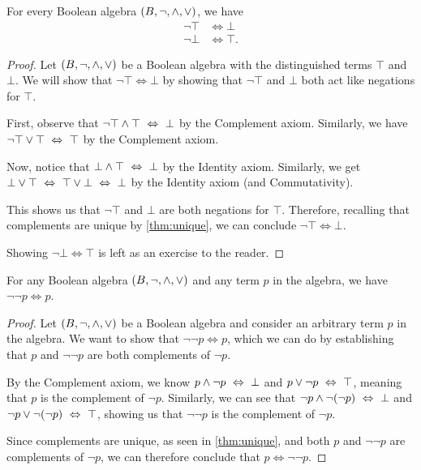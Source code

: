 \begin{lemma}
    For every Boolean algebra \((B, \neg, \wedge, \vee)\), we have
    \begin{align*}
        \neg \top &\iff \bot\\
        \neg \bot &\iff \top.
    \end{align*}
\end{lemma}
\begin{proof}
    Let \((B, \neg, \wedge, \vee)\) be a Boolean algebra with the distinguished terms \(\top\) and \(\bot\).
    We will show that \(\neg \top \iff \bot\) by showing that
    \(\neg \top\) and \(\bot\) both act like negations for \(\top\).

    First, observe that \(\neg \top \wedge \top ~\Leftrightarrow~ \bot\) by the Complement axiom.
    Similarly, we have \(\neg \top \vee \top ~\Leftrightarrow~ \top\) by the Complement axiom.

    Now, notice that \(\bot \wedge \top ~\Leftrightarrow~ \bot\) by the Identity axiom.
    Similarly, we get \(\bot \vee \top ~\Leftrightarrow~ \top \vee \bot ~\Leftrightarrow~ \bot\) by the Identity axiom
    (and Commutativity).

    This shows us that \(\neg \top\) and \(\bot\) are both negations for \(\top\).
    Therefore, recalling that complements are unique by \autoref{thm:unique},
    we can conclude \(\neg \top \iff \bot\).

    Showing \(\neg \bot \iff \top\) is left as an exercise to the reader.
\end{proof}

\newpage

\begin{theorem}
    For any Boolean algebra \((B, \neg, \wedge, \vee)\) and any term \(p\) in the algebra,
    we have \(\neg \neg p \iff p\).
\end{theorem}
\begin{proof}
    Let \((B, \neg, \wedge, \vee)\) be a Boolean algebra
    and consider an arbitrary term \(p\) in the algebra.
    We want to show that \(\neg \neg p \iff p\),
    which we can do by establishing that \(p\) and \(\neg \neg p\) are both complements of \(\neg p\).

    By the Complement axiom, we know \(p \wedge \neg p ~\Leftrightarrow~ \bot\) and \(p \vee \neg p ~\Leftrightarrow~ \top\),
    meaning that \(p\) is the complement of \(\neg p\).
    Similarly, we can see that
    \(\neg p \wedge \neg (\neg p) ~\Leftrightarrow~ \bot\) and \(\neg p \vee \neg (\neg p) ~\Leftrightarrow~ \top\),
    showing us that \(\neg \neg p\) is the complement of \(\neg p\).

    Since complements are unique, as seen in \autoref{thm:unique},
    and both \(p\) and \(\neg \neg p\) are complements of \(\neg p\),
    we can therefore conclude that \(p \iff \neg \neg p\).
\end{proof}

